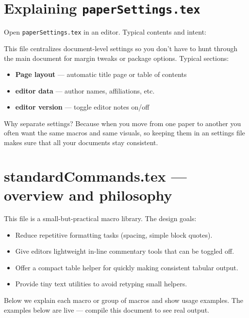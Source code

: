 \documentclass[nonacm, sigconf, balance=true]{acmart}
\begin{document}


    \section{Explaining \texttt{paperSettings.tex}}
    Open \texttt{paperSettings.tex} in an editor. Typical contents and intent:

    This file centralizes document-level settings so you don't have to hunt through the main document for margin tweaks or package options. Typical sections:
    \begin{itemize}
        \item \textbf{Page layout} — automatic title page or table of contents
        \item \textbf{editor data} — author names, affiliations, etc.
        \item \textbf{editor version} — toggle editor notes on/off
    \end{itemize}

    Why separate settings? Because when you move from one paper to another you often want the same macros and same visuals, so keeping them in an settings file makes sure that all your documents stay consistent.



    \section{standardCommands.tex — overview and philosophy}
    This file is a small-but-practical macro library. The design goals:
    \begin{itemize}
        \item Reduce repetitive formatting tasks (spacing, simple block quotes).
        \item Give editors lightweight in-line commentary tools that can be toggled off.
        \item Offer a compact table helper for quickly making consistent tabular output.
        \item Provide tiny text utilities to avoid retyping small helpers.
    \end{itemize}

    Below we explain each macro or group of macros and show usage examples. The examples below are live — compile this document to see real output.

\end{document}
